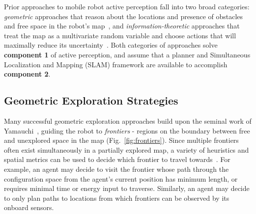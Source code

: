 Prior approaches to mobile robot active perception fall into two
broad categories: \textit{geometric} approaches that reason about the locations and
presence of obstacles and free space in the robot's
map~\cite{acar2002sensor,chan1993line,wang2007view,
burgard2000collaborative,taylor1993exploration,yamauchi1997frontier}, and
\textit{information-theoretic} approaches that treat the map as
a multivariate random variable and choose actions that will maximally reduce its
uncertainty~\cite{amigoni2010information,bourgault2002information,charrow2015icra,
julian2013mutual,feder1999adaptive}. Both categories of approaches solve {\bf
component 1} of active perception, and assume that a planner and Simultaneous
Localization and Mapping (SLAM) framework are available to accomplish {\bf
component 2}.

\subsection{Geometric Exploration Strategies}

Many successful geometric exploration approaches build upon the seminal work of
Yamauchi~\cite{yamauchi1997frontier}, guiding the robot to \textit{frontiers} - regions on the boundary
between free and unexplored space in the map (Fig.~\ref{fig:frontiers}).
Since multiple frontiers often exist simultaneously in a partially explored map, a
variety of heuristics and spatial metrics can be used to decide which frontier to
travel towards~\cite{lavalle2006planning}. For example, an agent may decide to
visit the frontier whose path through the configuration space from the agent's current
position has minimum length, or requires minimal time or energy input to
traverse. Similarly, an agent may decide to only plan paths to locations
from which frontiers can be observed by its onboard sensors.

